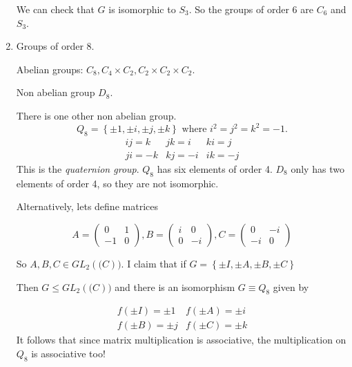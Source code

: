 \documentclass{article}
\theoremstyle{definition}
\begin{document}
\begin{enumerate}
We can check that  $G$ is isomorphic to $S_3$. So the groups of order 6 are $C_6$ and $S_3$.

\item Groups of order 8.

  Abelian groups: $C_8,C_4\times C_2, C_2 \times C_2 \times C_2.$ 

  Non abelian group $D_8$.

  There is one other non abelian group.
  \begin{equation*}
    Q_8 = \left\{ \pm1, \pm i, \pm j, \pm k \right\} \text{ where } i^2=j^2=k^2=-1.
    \label{}
  \end{equation*}
  \begin{equation*}
    \begin{matrix}
      ij=k & jk=i & ki=j \\
      ji=-k & kj=-i & ik=-j
    \end{matrix}
  \end{equation*}
  This is the \emph{quaternion group}. 
  $Q_8$ has six elements of order 4. 
  $D_8$ only has two elements of order 4, so they are not isomorphic.

  Alternatively, lets define matrices

  \begin{equation*}
    A = \left( 
\begin{matrix}
  0 & 1 \\
  -1 & 0
\end{matrix} 
    \right),
   B = \left( 
   \begin{matrix}
     i & 0 \\
     0 & -i
   \end{matrix}
   \right),
   C = 
   \left( 
\begin{matrix}
  0 & -i \\
  -i & 0
\end{matrix}
   \right)
    \label{}
\end{equation*}

  So $A,B,C \in GL_2(\mathbb(C))$. I claim that if $G = \left\{ \pm I, \pm A, \pm B, \pm C \right\}$

  Then $G \leq GL_2(\mathbb(C))$ and there is an isomorphism $G \equiv Q_8$ given by 

  \begin{equation*}
    \begin{matrix}
      f(\pm I ) = \pm 1 & f(\pm A) = \pm i \\
      f(\pm B ) = \pm j & f(\pm C ) = \pm k
    \end{matrix}
    \label{}
  \end{equation*}
  It follows that since matrix multiplication is associative, the multiplication on $Q_8$ is associative too!


\end{enumerate}
\end{document}
